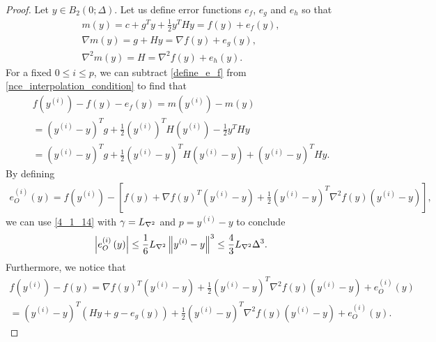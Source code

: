 \documentclass{article}
\begin{document}
\begin{proof}
Let $y \in B_2(0; \Delta)$.
Let us define error functions $e_f$, $e_g$ and $e_h$ so that
\begin{align}
m(y) = c + g^T y + \frac 1 2 y^T H y = f(y) + e_f(y) \label{define_e_f}, \\
\nabla m(y) = g + H y = \nabla f(y) + e_g(y), \nonumber \\
\nabla^2 m(y) = H = \nabla^2 f(y) + e_h(y). \nonumber
\end{align}
For a fixed $0 \le i \le p$, we can subtract \cref{define_e_f} from \cref{nce_interpolation_condition} to find that
\begin{align}
f\left(y^{(i)}\right) - f(y) - e_f(y)
= m\left(y^{(i)}\right) - m(y) \nonumber \\
= \left(y^{(i)} - y\right)^Tg + \frac 1 2 \left(y^{(i)}\right)^T H \left(y^{(i)}\right) - \frac 1 2 y^T H y \nonumber \\
= \left(y^{(i)} - y\right)^T g  + \frac 1 2 \left(y^{(i)} - y\right)^T H \left(y^{(i)} - y\right) + \left(y^{(i)} - y\right)^TH y. \label{nec_eqn2}
\end{align}
By defining
\begin{align*}
e^{(i)}_O(y) = 
f\left(y^{(i)}\right) - \left[f(y) + \nabla f(y)^T \left(y^{(i)} - y\right) + \frac 1 2 \left(y^{(i)} - y\right)^T \nabla^2 f(y) \left(y^{(i)} - y\right)\right],
\end{align*}
we can use \cref{4_1_14} with $\gamma = {L_{\nabla^2}}$ and $p = y^{(i)} - y$ to conclude
\begin{align}
\left|e^{(i)}_O\left(y\right) \right| \le \frac 1 6 {L_{\nabla^2}} \left\|y^{(i)} - y\right\|^3 \le \frac 4 3 {L_{\nabla^2}} \Delta^3 \label{nce_bound_rhs}.
\end{align}
Furthermore, we notice that
\begin{align*}
f\left(y^{(i)}\right) - f(y)
= \nabla f(y)^T \left(y^{(i)} - y\right) + \frac 1 2 \left(y^{(i)} - y\right)^T \nabla^2 f(y) \left(y^{(i)} - y\right) + e^{(i)}_O\left(y\right) \\
= \left(y^{(i)} - y\right)^T \left(Hy + g - e_g(y)\right) + \frac 1 2 \left(y^{(i)} - y\right)^T \nabla^2 f(y) \left(y^{(i)} - y\right) + e^{(i)}_O\left(y\right).

\end{align*}
\end{proof}
\end{document}
